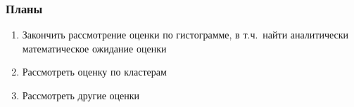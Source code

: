 \documentclass[unicode, notheorems]{beamer}
\begin{document}
  \begin{frame}
    \frametitle{Планы}
    \begin{enumerate}
    \item Закончить рассмотрение оценки по гистограмме, в т.ч.\ найти аналитически математическое ожидание оценки
    \item Рассмотреть оценку по кластерам
    \item Рассмотреть другие оценки
  \end{enumerate}
  \end{frame}
\end{document}
